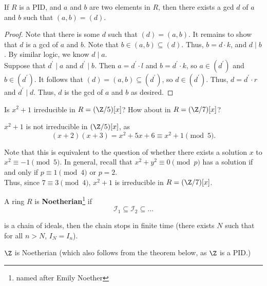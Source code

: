 \documentclass[11pt]{article}
\begin{document}
\begin{lemma}
If $R$ is a PID, and $a$ and $b$ are two elements in $R$, then there exists a gcd $d$ of $a$ and $b$ such that $(a, b) = (d).$
\end{lemma}

\begin{proof}
Note that there is some $d$ such that $(d) = (a, b)$. It remains to show that $d$ is a gcd of $a$ and $b$. Note that $b \in (a, b) \subseteq (d)$. Thus, $b = d\cdot k$, and $d \mid b$. 
By similar logic, we know $d \mid a$. \\

Suppose that $d^{\prime}  \mid a$ and $d^{\prime} \mid b$. Then $a = d^{\prime} \cdot l$ and $b = d^{\prime} \cdot k$, so $a \in (d^{\prime})$ and $b \in (d^{\prime}).$
It follows that $(d) = (a, b) \subseteq (d^{\prime})$, so $d \in (d^{\prime}).$ Thus, $d = d^{\prime} \cdot r$ and $d^{\prime} \mid d$.
Thus, $d$ is the gcd of $a$ and $b$ as desired.
\end{proof}

\begin{exercise}
Is $x^2 + 1$ irreducible in $R = (\Z / 5)[x]$? How about in $R = (\Z / 7)[x]$?
\end{exercise}

\begin{answer}
$x^2 + 1$ is not irreducible in $(\Z / 5)[x]$, as 
\[
    (x+2)(x+3) = x^2 + 5x + 6 \equiv x^2 + 1 \pmod 5.
\]

Note that this is equivalent to the question of whether there exists a solution $x$ to $x^2 \equiv -1 \pmod 5$. 
In general, recall that $x^2 + y^2 \equiv 0 \pmod p$ has a solution if and only if $p \equiv 1 \pmod 4$ or $p=2$. \\

Thus, since $7 \equiv 3 \pmod 4$, $x^2 + 1$ is irreducible in $R = (\Z / 7)[x]$.
\end{answer}

\begin{definition}
A ring $R$ is \textbf{Noetherian}\footnote{named after Emily Noether} if 
\[
    \mathcal{I}_1 \subseteq \mathcal{I}_2 \subseteq  \dots
\]

is a chain of ideals, then the chain stops in finite time (there exists $N$ such that for all $n > N$, $I_N=I_n$).
\end{definition}

\begin{remark}
$\Z$ is Noetherian (which also follows from the theorem below, as $\Z$ is a PID.)
\end{remark}
\end{document}
